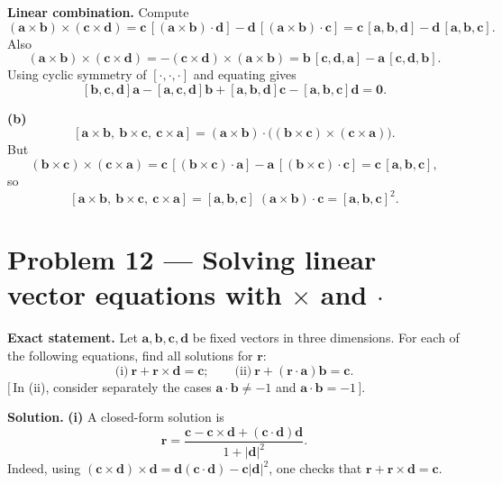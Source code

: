 \documentclass[12pt,a4paper]{article}
\theoremstyle{plain}
\theoremstyle{definition}      %
\begin{document}
\medskip
\noindent\textbf{Linear combination.}
Compute
\[
(\mathbf a\times\mathbf b)\times(\mathbf c\times\mathbf d)
=\mathbf c\,[(\mathbf a\times\mathbf b)\cdot\mathbf d]-\mathbf d\,[(\mathbf a\times\mathbf b)\cdot\mathbf c]
=\mathbf c\,[\mathbf a,\mathbf b,\mathbf d]-\mathbf d\,[\mathbf a,\mathbf b,\mathbf c].
\]
Also
\[
(\mathbf a\times\mathbf b)\times(\mathbf c\times\mathbf d)
=-(\mathbf c\times\mathbf d)\times(\mathbf a\times\mathbf b)
=\mathbf b\,[\mathbf c,\mathbf d,\mathbf a]-\mathbf a\,[\mathbf c,\mathbf d,\mathbf b].
\]
Using cyclic symmetry of \([\cdot,\cdot,\cdot]\) and equating gives
\[
[\mathbf b,\mathbf c,\mathbf d]\mathbf a-[\mathbf a,\mathbf c,\mathbf d]\mathbf b+[\mathbf a,\mathbf b,\mathbf d]\mathbf c-[\mathbf a,\mathbf b,\mathbf c]\mathbf d=\mathbf 0.
\]

\medskip
\noindent\textbf{(b)}
\[
[\mathbf a\times\mathbf b,\ \mathbf b\times\mathbf c,\ \mathbf c\times\mathbf a]
=(\mathbf a\times\mathbf b)\cdot\bigl((\mathbf b\times\mathbf c)\times(\mathbf c\times\mathbf a)\bigr).
\]
But
\[
(\mathbf b\times\mathbf c)\times(\mathbf c\times\mathbf a)
=\mathbf c\,[(\mathbf b\times\mathbf c)\cdot\mathbf a]-\mathbf a\,[(\mathbf b\times\mathbf c)\cdot\mathbf c]
=\mathbf c\,[\mathbf a,\mathbf b,\mathbf c],
\]
so
\[
[\mathbf a\times\mathbf b,\ \mathbf b\times\mathbf c,\ \mathbf c\times\mathbf a]
=[\mathbf a,\mathbf b,\mathbf c]\;(\mathbf a\times\mathbf b)\cdot\mathbf c
=[\mathbf a,\mathbf b,\mathbf c]^2.
\]


\section*{Problem 12 — Solving linear vector equations with \(\times\) and \(\cdot\)}

\textbf{Exact statement.}
Let \(\mathbf a,\mathbf b,\mathbf c,\mathbf d\) be fixed vectors in three dimensions. For each of the following equations,
find all solutions for \(\mathbf r\):
\[
\text{(i)}\ \mathbf r+\mathbf r\times\mathbf d=\mathbf c;\qquad
\text{(ii)}\ \mathbf r+(\mathbf r\cdot\mathbf a)\mathbf b=\mathbf c.
\]
\([\,\)In (ii), consider separately the cases \(\mathbf a\cdot\mathbf b\ne -1\) and \(\mathbf a\cdot\mathbf b=-1\,]\).

\textbf{Solution.}
\textbf{(i)} A closed-form solution is
\[
\mathbf r=\frac{\mathbf c-\mathbf c\times\mathbf d+(\mathbf c\cdot\mathbf d)\mathbf d}{1+|\mathbf d|^2}.
\]
Indeed, using \((\mathbf c\times\mathbf d)\times\mathbf d=\mathbf d(\mathbf c\cdot\mathbf d)-\mathbf c|\mathbf d|^2\),
one checks that \(\mathbf r+\mathbf r\times\mathbf d=\mathbf c\).
\end{document}
